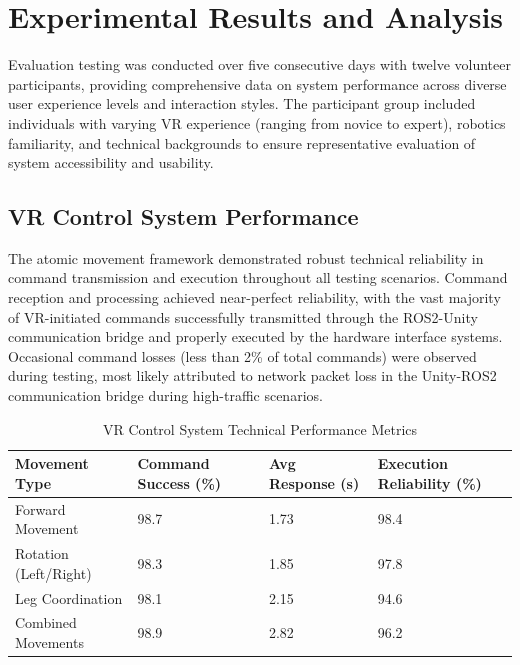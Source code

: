 \section{Experimental Results and Analysis}
\label{sec:experimental_results}

Evaluation testing was conducted over five consecutive days with twelve volunteer participants, providing comprehensive data on system performance across diverse user experience levels and interaction styles. The participant group included individuals with varying VR experience (ranging from novice to expert), robotics familiarity, and technical backgrounds to ensure representative evaluation of system accessibility and usability.

\subsection{VR Control System Performance}

The atomic movement framework demonstrated robust technical reliability in command transmission and execution throughout all testing scenarios. Command reception and processing achieved near-perfect reliability, with the vast majority of VR-initiated commands successfully transmitted through the ROS2-Unity communication bridge and properly executed by the hardware interface systems. Occasional command losses (less than 2\% of total commands) were observed during testing, most likely attributed to network packet loss in the Unity-ROS2 communication bridge during high-traffic scenarios.

\begin{table}[H]
    \centering
    \footnotesize
    \begin{tabular}{|p{3cm}|p{1.8cm}|p{1.8cm}|p{1.8cm}|}
        \hline
        \textbf{Movement Type} & \textbf{Command Success (\%)} & \textbf{Avg Response (s)} & \textbf{Execution Reliability (\%)} \\
        \hline
        Forward Movement & 98.7 & 1.73 & 98.4 \\
        Rotation (Left/Right) & 98.3 & 1.85 & 97.8 \\
        Leg Coordination & 98.1 & 2.15 & 94.6 \\
        Combined Movements & 98.9 & 2.82 & 96.2 \\
        \hline
    \end{tabular}
    \caption{VR Control System Technical Performance Metrics}
    \label{tab:vr_control_performance}
\end{table}

